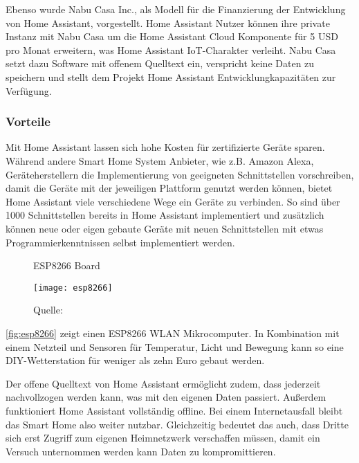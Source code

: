 Ebenso wurde Nabu Casa Inc., als Modell für die Finanzierung der Entwicklung von Home Assistant, vorgestellt.
Home Assistant Nutzer können ihre private Instanz mit Nabu Casa um die Home Assistant Cloud Komponente für 5 USD pro Monat erweitern, was Home Assistant \ac{IoT}-Charakter verleiht.
Nabu Casa setzt dazu Software mit offenem Quelltext ein, verspricht keine Daten zu speichern und stellt dem Projekt Home Assistant Entwicklungkapazitäten zur Verfügung.

\subsubsection{Vorteile}

Mit Home Assistant lassen sich hohe Kosten für zertifizierte Geräte sparen.
Während andere Smart Home System Anbieter, wie z.B. Amazon Alexa, Geräteherstellern die Implementierung von geeigneten Schnittstellen vorschreiben, damit die Geräte mit der jeweiligen Plattform genutzt werden können, bietet Home Assistant viele verschiedene Wege ein Geräte zu verbinden.
So sind über 1000 Schnittstellen bereits in Home Assistant implementiert und zusätzlich können neue oder eigen gebaute Geräte mit neuen Schnittstellen mit etwas Programmierkenntnissen selbst implementiert werden.

\begin{wrapfigure}{r}{0.4\textwidth}
	\centering
	\caption{ESP8266 Board}
	\texttt{[image: esp8266]}
	\caption*{\footnotesize{Quelle: }}
	\label{fig:esp8266}
\end{wrapfigure}

\autoref{fig:esp8266} zeigt einen ESP8266 WLAN Mikrocomputer.
In Kombination mit einem Netzteil und Sensoren für Temperatur, Licht und Bewegung kann so eine \ac{DIY}-Wetterstation für weniger als zehn Euro gebaut werden.

Der offene Quelltext von Home Assistant ermöglicht zudem, dass jederzeit nachvollzogen werden kann, was mit den eigenen Daten passiert.
Außerdem funktioniert Home Assistant vollständig offline.
Bei einem Internetausfall bleibt das Smart Home also weiter nutzbar.
Gleichzeitig bedeutet das auch, dass Dritte sich erst Zugriff zum eigenen Heimnetzwerk verschaffen müssen, damit ein Versuch unternommen werden kann Daten zu kompromittieren.

